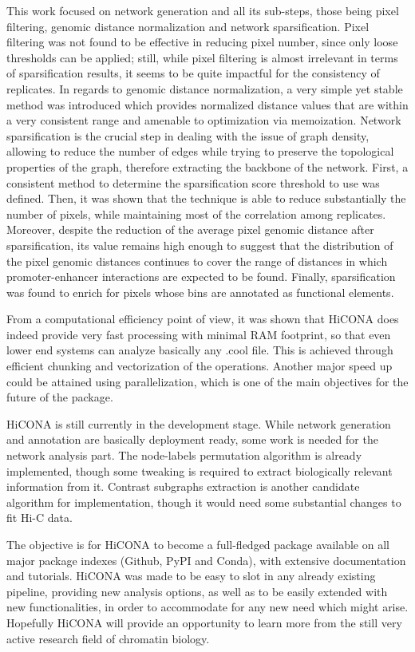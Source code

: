 This work focused on network generation and all its sub-steps, those being pixel filtering, genomic distance normalization and network sparsification. Pixel filtering was not found to be effective in reducing pixel number, since only loose thresholds can be applied; still, while pixel filtering is almost irrelevant in terms of sparsification results, it seems to be quite impactful for the consistency of replicates. In regards to genomic distance normalization, a very simple yet stable method was introduced which provides normalized distance values that are within a very consistent range and amenable to optimization via memoization. Network sparsification is the crucial step in dealing with the issue of graph density, allowing to reduce the number of edges while trying to preserve the topological properties of the graph, therefore extracting the backbone of the network. First, a consistent method to determine the sparsification score threshold to use was defined. Then, it was shown that the technique is able to reduce substantially the number of pixels, while maintaining most of the correlation among replicates. Moreover, despite the reduction of the average pixel genomic distance after sparsification, its value remains high enough to suggest that the distribution of the pixel genomic distances continues to cover the range of distances in which promoter-enhancer interactions are expected to be found. Finally, sparsification was found to enrich for pixels whose bins are annotated as functional elements.

From a computational efficiency point of view, it was shown that HiCONA does indeed provide very fast processing with minimal RAM footprint, so that even lower end systems can analyze basically any .cool file. This is achieved through efficient chunking and vectorization of the operations. Another major speed up could be attained using parallelization, which is one of the main objectives for the future of the package. 

HiCONA is still currently in the development stage. While network generation and annotation are basically deployment ready, some work is needed for the network analysis part. The node-labels permutation algorithm is already implemented, though some tweaking is required to extract biologically relevant information from it. Contrast subgraphs extraction is another candidate algorithm for implementation, though it would need some substantial changes to fit Hi-C data. 

The objective is for HiCONA to become a full-fledged package available on all major package indexes (Github, PyPI and Conda), with extensive documentation and tutorials. HiCONA was made to be easy to slot in any already existing pipeline, providing new analysis options, as well as to be easily extended with new functionalities, in order to accommodate for any new need which might arise. Hopefully HiCONA will provide an opportunity to learn more from the still very active research field of chromatin biology.
